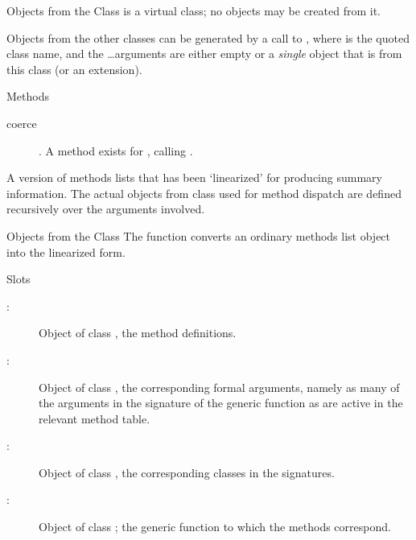 %
\begin{Section}{Objects from the Class}
 is a virtual class; no objects may be created from
it.

Objects from the other classes can be generated by a call to
, where  is the quoted class name, and
the \dots arguments are either empty or a \emph{single} object that is
from this class (or an extension).
\end{Section}
%
\begin{Section}{Methods}
\begin{description}

\item[coerce] .  A method
exists for , calling . 

\end{description}


\end{Section}
%
\begin{Description}\relax
A version of methods lists that has been `linearized'
for producing summary information.  The actual objects from class
 used for method dispatch are defined recursively
over the arguments involved.
\end{Description}
%
\begin{Section}{Objects from the Class}
The function  converts an ordinary methods
list object into the linearized form.
\end{Section}
%
\begin{Section}{Slots}
\begin{description}

\item[:] Object of class , the method
definitions.
\item[:] Object of class , the
corresponding formal arguments, namely as many of the arguments
in the signature of the generic function as are active in the
relevant method table. 
\item[:] Object of class , the
corresponding classes in the signatures. 
\item[:] Object of class ;
the generic function to which the methods correspond. 

\end{description}

\end{Section}
